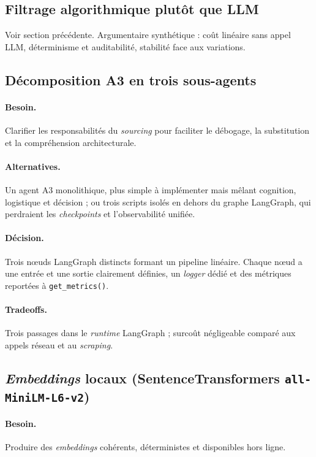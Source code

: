\subsection{Filtrage algorithmique plutôt que LLM}

Voir section précédente. Argumentaire synthétique : coût linéaire sans appel LLM, déterminisme et auditabilité, stabilité face aux variations.

\subsection{Décomposition A3 en trois sous-agents}

\paragraph{Besoin.} Clarifier les responsabilités du \textit{sourcing} pour faciliter le débogage, la substitution et la compréhension architecturale.

\paragraph{Alternatives.} Un agent A3 monolithique, plus simple à implémenter mais mêlant cognition, logistique et décision ; ou trois scripts isolés en dehors du graphe LangGraph, qui perdraient les \textit{checkpoints} et l'observabilité unifiée.

\paragraph{Décision.} Trois nœuds LangGraph distincts formant un pipeline linéaire. Chaque nœud a une entrée et une sortie clairement définies, un \textit{logger} dédié et des métriques reportées à \texttt{get\_metrics()}.

\paragraph{Tradeoffs.} Trois passages dans le \textit{runtime} LangGraph ; surcoût négligeable comparé aux appels réseau et au \textit{scraping}.

\subsection{\textit{Embeddings} locaux (SentenceTransformers \texttt{all-MiniLM-L6-v2})}

\paragraph{Besoin.} Produire des \textit{embeddings} cohérents, déterministes et disponibles hors ligne.


